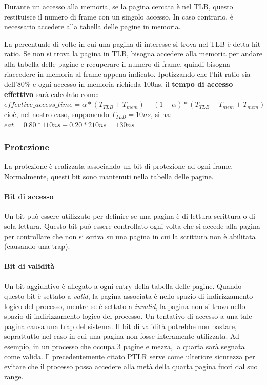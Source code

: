\documentclass[a4paper]{article}
\begin{document}
Durante un accesso alla memoria, se la pagina cercata è nel TLB, questo restituisce il numero di frame con un singolo accesso. In caso contrario, è necessario accedere alla tabella delle pagine in memoria.

La percentuale di volte in cui una pagina di interesse si trova nel TLB è detta hit ratio. Se non si trova la pagina in TLB, bisogna accedere alla memoria per andare alla tabella delle pagine e recuperare il numero di frame, quindi bisogna riaccedere in memoria al frame appena indicato. Ipotizzando che l'hit ratio sia dell'80\% e ogni accesso in memoria richieda 100ns, il \textbf{tempo di accesso effettivo} sarà calcolato come: \newline
$ effective\_access\_time = \alpha * (T_{TLB}+T_{mem}) + (1-\alpha) * (T_{TLB}+T_{mem} + T_{mem}) $\newline
cioè, nel nostro caso, supponendo $T_{TLB} = 10ns$, si ha:\newline
$ eat = 0.80 * 110ns + 0.20 * 210ns = 130ns $\newline

\subsubsection{Protezione}
La protezione è realizzata associando un bit di protezione ad ogni frame. Normalmente, questi bit sono mantenuti nella tabella delle pagine.
\paragraph{Bit di accesso} Un bit può essere utilizzato per definire se una pagina è di lettura-scrittura o di sola-lettura. Questo bit può essere controllato ogni volta che si accede alla pagina per controllare che non si scriva su una pagina in cui la scrittura non è abilitata (causando una trap).
\paragraph{Bit di validità} Un bit aggiuntivo è allegato a ogni entry della tabella delle pagine. Quando questo bit è settato a \textit{valid}, la pagina associata è nello spazio di indirizzamento logico del processo, mentre se è settato a \textit{invalid}, la pagina non si trova nello spazio di indirizzamento logico del processo. Un tentativo di accesso a una tale pagina causa una trap del sistema. Il bit di validità potrebbe non bastare, soprattutto nel caso in cui una pagina non fosse interamente utilizzata. Ad esempio, in un processo che occupa 3 pagine e mezza, la quarta sarà segnata come valida. Il precedentemente citato PTLR serve come ulteriore sicurezza per evitare che il processo possa accedere alla metà della quarta pagina fuori dal suo range.
\end{document}
